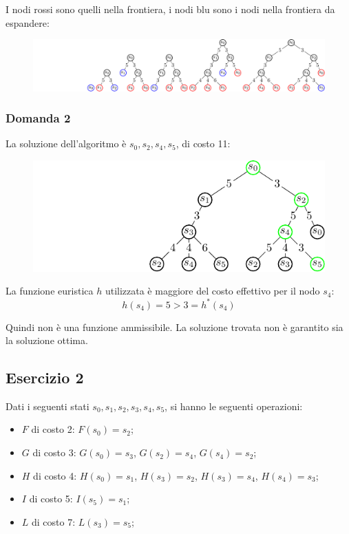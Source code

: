 \documentclass{article}
\numberwithin{equation}{section}
\begin{document}
I nodi rossi sono quelli nella frontiera, i nodi blu sono i nodi nella frontiera da espandere:

\begin{figure}[H]%
    \centering%
    \includegraphics[trim={3.9cm 0 0 0}, scale=0.95]{albero_esercitazione_1.pdf}%
\end{figure}

\subsubsection*{Domanda 2}

La soluzione dell'algoritmo è $s_0,s_2,s_4,s_5$, di costo 11:
\begin{figure}[H]%
    \centering%
    \includegraphics[trim={4cm 0 0 0}]{soluzione_esercitazione_1.pdf}%
\end{figure}

La funzione euristica $h$ utilizzata è maggiore del costo effettivo per il nodo $s_4$: 
\begin{equation}
    h(s_4)=5>3=h^*(s_4)
\end{equation}

Quindi non è una funzione ammissibile. La soluzione trovata 
non è garantito sia la soluzione ottima. 

\subsection{Esercizio 2}

Dati i seguenti stati $s_0, s_1,s_2,s_3,s_4,s_5$, si hanno le seguenti operazioni:
\begin{itemize}
    \item $F$ di costo 2: $F(s_0)=s_2$;
    \item $G$ di costo 3: $G(s_0)=s_3$, $G(s_2)=s_4$, $G(s_4)=s_2$;
    \item $H$ di costo 4: $H(s_0)=s_1$, $H(s_3)=s_2$, $H(s_3)=s_4$, $H(s_4)=s_3$;
    \item $I$ di costo 5: $I(s_5)=s_1$;
    \item $L$ di costo 7: $L(s_3)=s_5$;
\end{itemize}
\end{document}
